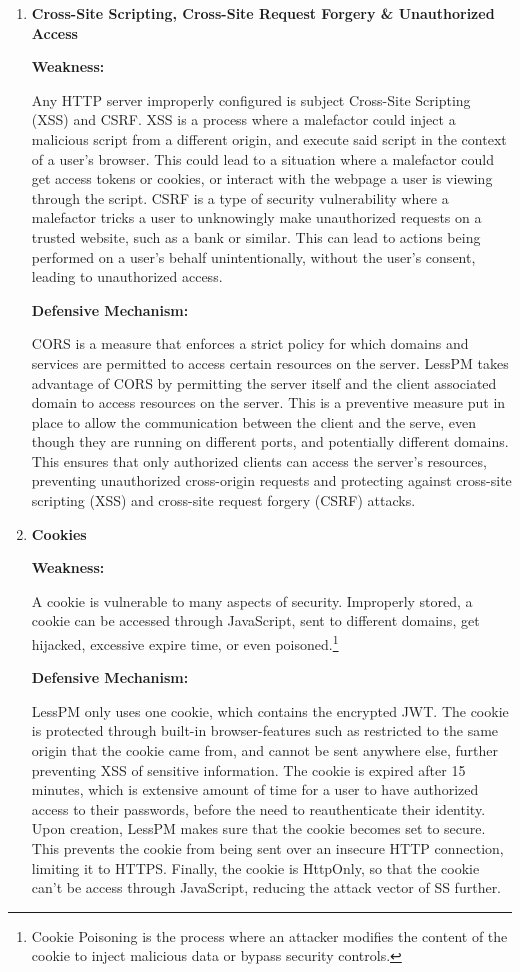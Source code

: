 \begin{enumerate}[label=$\blacktriangleright$]
  \item \textbf{
    Cross-Site Scripting,
    Cross-Site Request Forgery
    \& Unauthorized Access}

  \textbf{Weakness:}

  Any HTTP server improperly configured is subject Cross-Site Scripting (XSS)
  and CSRF\@.
  XSS is a process where a malefactor could inject a malicious script from a
  different origin, and execute said script in the context of a user's browser.
  This could lead to a situation where a malefactor could get access tokens
  or cookies, or interact with the webpage a user is viewing through the
  script.
  CSRF is a type of security vulnerability where a malefactor tricks a user
  to unknowingly make unauthorized requests on a trusted website, such as a
  bank or similar.
  This can lead to actions being performed on a user's behalf unintentionally,
  without the user's consent, leading to unauthorized access.

  \textbf{Defensive Mechanism:}

  CORS is a measure that enforces a strict policy for which domains and services
  are permitted to access certain resources on the server.
  LessPM takes advantage of CORS by permitting the server itself and the
  client associated domain to access resources on the server.
  This is a preventive measure put in place to allow the communication
  between the client and the serve, even though they are running on different
  ports, and potentially different domains.
  This ensures that only authorized clients can access the server's resources,
  preventing unauthorized cross-origin requests and protecting against
  cross-site scripting (XSS) and cross-site request forgery (CSRF) attacks.

  \item \textbf{Cookies}

  \textbf{Weakness:}

  A cookie is vulnerable to many aspects of security.
  Improperly stored, a cookie can be accessed through JavaScript, sent to
  different domains, get hijacked, excessive expire time, or even poisoned.\footnote{
    Cookie Poisoning is the process where an attacker modifies the content of
    the cookie to inject malicious data or bypass security controls.
  }

  \textbf{Defensive Mechanism:}

  LessPM only uses one cookie, which contains the encrypted JWT\@.
  The cookie is protected through built-in browser-features such as
  restricted to the same origin that the cookie came from, and cannot be sent
  anywhere else, further preventing XSS of sensitive information\@.
  The cookie is expired after 15 minutes, which is extensive amount of time
  for a user to have authorized access to their passwords, before the need to
  reauthenticate their identity.
  Upon creation, LessPM makes sure that the cookie becomes set to secure.
  This prevents the cookie from being sent over an insecure HTTP connection,
  limiting it to HTTPS\@.
  Finally, the cookie is HttpOnly, so that the cookie can't be access through
  JavaScript, reducing the attack vector of SS further.

\end{enumerate}

